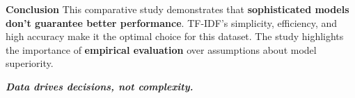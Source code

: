\documentclass[final]{beamer}
\newlength{\onecolwid}
\begin{document}
\begin{frame}[fragile]
\begin{columns}[t]
\begin{column}{\onecolwid}
\begin{block}{\Large \textbf{Conclusion}}
  This comparative study demonstrates that \textbf{sophisticated models don't guarantee better performance}. TF-IDF's simplicity, efficiency, and high accuracy make it the optimal choice for this dataset. The study highlights the importance of \textbf{empirical evaluation} over assumptions about model superiority.
  
  \vspace{0.3cm}
  \centering \small \textit{\textbf{Data drives decisions, not complexity.}}
\end{block}

\end{column}

\end{columns}

\end{frame}
\end{document}
